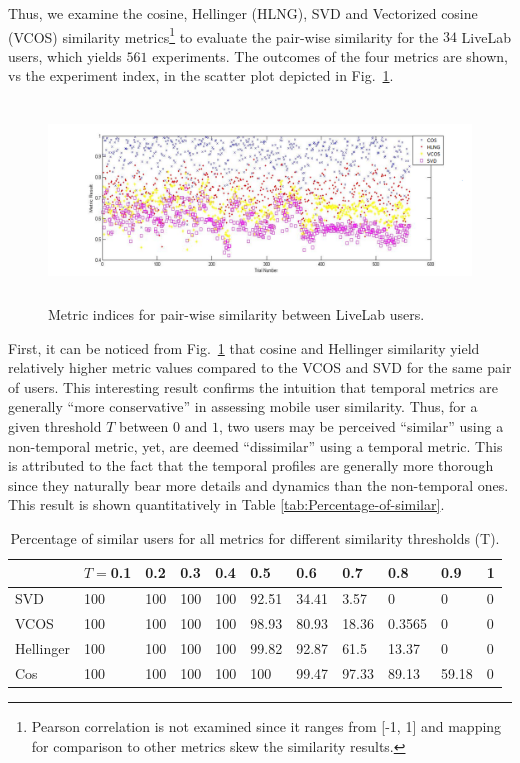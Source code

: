 \documentclass[conference]{IEEEtran}
\theoremstyle{definition}
\begin{document}
Thus, we examine the cosine, Hellinger (HLNG), SVD and Vectorized cosine (VCOS) 
similarity metrics\footnote{Pearson correlation is not examined since it ranges 
from [-1, 1] and mapping for comparison to other metrics skew the similarity results.} 
to evaluate the pair-wise similarity for the $34$ LiveLab users,
which yields $561$ experiments. The outcomes of the four metrics
are shown, vs the experiment index, in the scatter plot depicted
in Fig.~\ref{fig:scatter}.
%
\begin{figure}[!tp]
  \centering
\includegraphics[width=12cm,height=5.3cm]{scatter.png}
 \caption{Metric indices for pair-wise similarity between LiveLab users.}
 \label{fig:scatter}
\end{figure}
%
First, it can be noticed from Fig.~\ref{fig:scatter} that cosine
and Hellinger similarity yield relatively higher metric values compared
to the VCOS and SVD for the same pair of users. This interesting result
confirms the intuition that temporal metrics are generally ``more
conservative'' in assessing mobile user similarity. Thus,
for a given threshold $T$ between $0$ and $1$, two users may be perceived ``similar'' using a non-temporal metric, yet, are deemed ``dissimilar'' using
a temporal metric. This is attributed to the fact that the temporal
profiles are generally more thorough since they naturally bear more details and dynamics 
than the non-temporal ones. This result is shown quantitatively in Table \ref{tab:Percentage-of-similar}.
\begin{table}
\caption{Percentage of similar users for all metrics for different similarity thresholds (T).}\label{tab:Percentage-of-similar}

\centering{}{} \label{tab:NonAndTemporal-Maj} %
\begin{tabular}{|l|l|l|l|l|l|l|l|l|l|l|}
\hline 
 & $T=$0.1 & 0.2  & 0.3  & 0.4  & 0.5  & 0.6  & 0.7  & 0.8  & 0.9  & 1\tabularnewline
\hline 
SVD  & 100  & 100  & 100  & 100  & 92.51  & 34.41  & 3.57  & 0  & 0  & 0\tabularnewline
\hline 
VCOS & 100  & 100  & 100  & 100  & 98.93  & 80.93  & 18.36  & 0.3565  & 0  & 0\tabularnewline
\hline 
Hellinger & 100  & 100  & 100  & 100  & 99.82  & 92.87  & 61.5  & 13.37  & 0  & 0\tabularnewline
\hline 
Cos & 100  & 100  & 100  & 100  & 100  & 99.47  & 97.33  & 89.13  & 59.18  & 0\tabularnewline
\hline 
\end{tabular}
\end{table}
\end{document}
